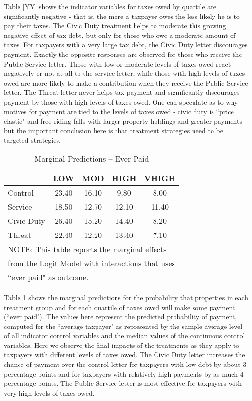 \documentclass[12pt,titlepage]{article}
\begin{document}
Table \ref{YY} shows the indicator variables for taxes owed by
quartile are significantly negative - that is, the more a taxpayer
owes the less likely he is to pay their taxes.  The Civic Duty
treatment helps to moderate this growing negative effect of tax debt,
but only for those who owe a moderate amount of taxes.  For taxpayers
with a very large tax debt, the Civic Duty letter discourages payment.
Exactly the opposite responses are observed for those who receive the
Public Service letter.  Those with low or moderate levels of taxes
owed react negatively or not at all to the service letter, while those
with high levels of taxes owed are more likely to make a contribution
when they receive the Public Service letter.  The Threat letter never
helps tax payment and significantly discourages payment by those with
high levels of taxes owed.  One can speculate as to why motives for
payment are tied to the levels of taxes owed - civic duty is ``price
elastic" and free riding falls with larger property holdings and
greater payments - but the important conclusion here is that treatment
strategies need to be targeted strategies.

\begin{table}[htbp]
\caption{Marginal  Predictions -- Ever Paid}  \label{ZZ} 
\bigskip
\begin{center}
\begin{tabular}{| l | c | c | c | c |}
  \hline
 & LOW & MOD & HIGH & VHIGH \\ 
  \hline
Control & 23.40 & 16.10 & 9.80 & 8.00 \\ 
  Service & 18.50 & 12.70 & 12.10 & 11.40 \\ 
  Civic Duty & 26.40 & 15.20 & 14.40 & 8.20 \\ 
  Threat & 22.40 & 12.20 & 13.40 & 7.10 \\ 
   \hline
\multicolumn{5}{l}{NOTE: This table reports the marginal effects} \\
\multicolumn{5}{l}{from the Logit Model with interactions that uses} \\
\multicolumn{5}{l}{``ever paid" as outcome.} \\
\end{tabular}
\end{center}
\end{table}


Table \ref{ZZ} shows the marginal predictions for the probability that
properties in each treatment group and for each quartile of taxes owed
will make some payment (``ever paid").  The values here represent the
predicted probability of payment, computed for the ``average taxpayer"
as represented by the sample average level of all indicator control
variables and the median values of the continuous control variables.
Here we observe the final impacts of the treatments as they apply to
taxpayers with different levels of taxes owed.  The Civic Duty letter
increases the chance of payment over the control letter for taxpayers
with low debt by about 3 percentage points and for taxpayers with
relatively high payments by as much 4 percentage points.  The Public
Service letter is most effective for taxpayers with very high levels
of taxes owed.
\end{document}
